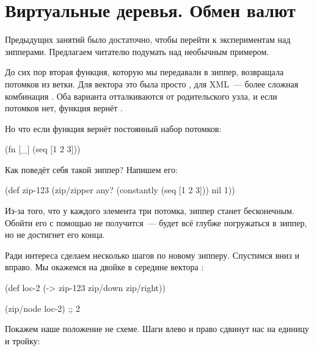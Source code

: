 \section{Виртуальные деревья. Обмен валют}

Предыдущих занятий было достаточно, чтобы перейти к экспериментам над
зипперами. Предлагаем читателю подумать над необычным примером.

До сих пор вторая функция, которую мы передавали в зиппер, возвращала потомков
из ветки. Для вектора это была просто , для XML~--- более сложная комбинация
. Оба варианта отталкиваются от родительского узла, и если
потомков нет, функция вернёт .

Но что если функция вернёт постоянный набор потомков:

\begin{english}
  \begin{clojure}
(fn [_]
  (seq [1 2 3]))
  \end{clojure}
\end{english}

Как поведёт себя такой зиппер? Напишем его:

\begin{english}
  \begin{clojure}
(def zip-123
  (zip/zipper any?
              (constantly (seq [1 2 3]))
              nil
              1))
  \end{clojure}
\end{english}

Из-за того, что у каждого элемента три потомка, зиппер станет бесконечным. Обойти
его с помощью  не получится~---  будет всё глубже погружаться
в зиппер, но не достигнет его конца.

Ради интереса сделаем несколько шагов по новому зипперу. Спустимся вниз и
вправо. Мы окажемся на двойке в середине вектора \code{[1 2 3]}:

\begin{english}
  \begin{clojure}
(def loc-2
  (-> zip-123
      zip/down
      zip/right))

(zip/node loc-2)
;; 2
  \end{clojure}
\end{english}

Покажем наше положение не схеме. Шаги влево и право сдвинут нас на единицу и
тройку:

\begin{figure}[H]
  \centering
  
\end{figure}

